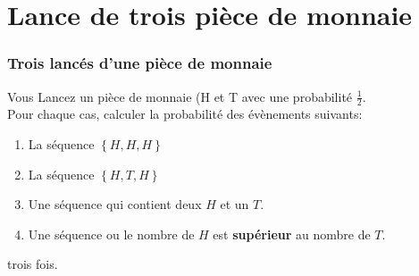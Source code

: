 \documentclass{beamer}
\begin{document}
\section{Lance de trois pièce de monnaie}
\begin{frame}[<+->]
    \frametitle{Trois lancés d'une pièce de monnaie}
    Vous Lancez un pièce de monnaie (H et T avec une probabilité
    $\frac{1}{2}$.\\[10pt]
    
    Pour chaque cas, calculer la probabilité des évènements suivants:\\[10pt]
    \begin{enumerate}
        \small
        \item La séquence  $\left\{H,H,H\right\}$\\[10pt]
        \item La séquence  $\left\{H,T,H\right\}$\\[10pt]
        \item Une séquence qui contient deux $H$ et un $T$.\\[10pt]
        \item Une séquence ou le nombre de $H$ est \alert{\textbf{supérieur}}
            au nombre de $T$.
    \end{enumerate}
\alert{trois fois}.
    
\end{frame}

\end{document}
